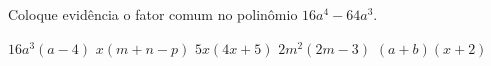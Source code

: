 Coloque evidência o fator comum no polinômio $16a^4-64a^3$.

$16a^3(a-4)$
$x(m+n-p)$
$5x(4x+5)$
$2m^2(2m-3)$
$(a+b)(x+2)$


